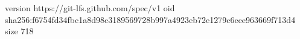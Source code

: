 version https://git-lfs.github.com/spec/v1
oid sha256:f6754fd34fbc1a8d98c3189569728b997a4923eb72e1279c6eee963669f713d4
size 718
